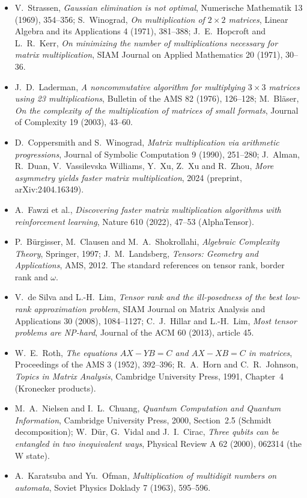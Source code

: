 \begin{itemize}
\item V.~Strassen, \emph{Gaussian elimination is not optimal}, Numerische Mathematik 13 (1969), 354--356; S.~Winograd, \emph{On
multiplication of $2\times2$ matrices}, Linear Algebra and its Applications 4 (1971), 381--388; J.~E.~Hopcroft and L.~R.~Kerr, \emph{On
minimizing the number of multiplications necessary for matrix multiplication}, SIAM Journal on Applied Mathematics 20 (1971), 30--36.
\item J.~D.~Laderman, \emph{A noncommutative algorithm for multiplying $3\times3$ matrices using 23 multiplications}, Bulletin of the
AMS 82 (1976), 126--128; M.~Bl\"aser, \emph{On the complexity of the multiplication of matrices of small formats}, Journal of
Complexity 19 (2003), 43--60.
\item D.~Coppersmith and S.~Winograd, \emph{Matrix multiplication via arithmetic progressions}, Journal of Symbolic Computation 9
(1990), 251--280; J.~Alman, R.~Duan, V.~Vassilevska Williams, Y.~Xu, Z.~Xu and R.~Zhou, \emph{More asymmetry yields faster matrix
multiplication}, 2024 (preprint, arXiv:2404.16349).
\item A.~Fawzi et al., \emph{Discovering faster matrix multiplication algorithms with reinforcement learning}, Nature 610 (2022),
47--53 (AlphaTensor).
\item P.~B\"urgisser, M.~Clausen and M.~A.~Shokrollahi, \emph{Algebraic Complexity Theory}, Springer, 1997; J.~M.~Landsberg,
\emph{Tensors: Geometry and Applications}, AMS, 2012. The standard references on tensor rank, border rank and $\omega$.
\item V.~de Silva and L.-H.~Lim, \emph{Tensor rank and the ill-posedness of the best low-rank approximation problem}, SIAM Journal
on Matrix Analysis and Applications 30 (2008), 1084--1127; C.~J.~Hillar and L.-H.~Lim, \emph{Most tensor problems are NP-hard},
Journal of the ACM 60 (2013), article 45.
\item W.~E.~Roth, \emph{The equations $AX-YB=C$ and $AX-XB=C$ in matrices}, Proceedings of the AMS 3 (1952), 392--396; R.~A.~Horn and
C.~R.~Johnson, \emph{Topics in Matrix Analysis}, Cambridge University Press, 1991, Chapter~4 (Kronecker products).
\item M.~A.~Nielsen and I.~L.~Chuang, \emph{Quantum Computation and Quantum Information}, Cambridge University Press, 2000,
Section~2.5 (Schmidt decomposition); W.~D\"ur, G.~Vidal and J.~I.~Cirac, \emph{Three qubits can be entangled in two inequivalent ways},
Physical Review A 62 (2000), 062314 (the W state).
\item A.~Karatsuba and Yu.~Ofman, \emph{Multiplication of multidigit numbers on automata}, Soviet Physics Doklady 7 (1963), 595--596.
\end{itemize}
